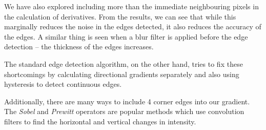 We have also explored including more than the immediate neighbouring pixels in the calculation of derivatives. From the results, we can see that while this marginally reduces the noise in the edges detected, it also reduces the accuracy of the edges. A similar thing is seen when a blur filter is applied before the edge detection -- the thickness of the edges increases.

The standard edge detection algorithm, on the other hand, tries to fix these shortcomings by calculating directional gradients separately and also using hysteresis to detect continuous edges.

Additionally, there are many ways to include 4 corner edges into our gradient. The \textit{Sobel} and \textit{Prewitt} operators are popular methods which use convolution filters to find the horizontal and vertical changes in intensity.


